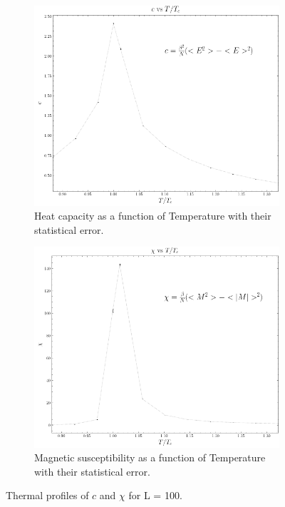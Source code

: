 \documentclass[article]{revtex4}
\begin{document}
\begin{figure}[h!]
\begin{subfigure}{.5\textwidth}
  \centering
  \includegraphics[width=0.7\linewidth]{heat_vs_T.png}
  \caption{Heat capacity as a function of Temperature with their statistical error.}
\end{subfigure}%
\begin{subfigure}{.5\textwidth}
  \centering
  \includegraphics[width=0.7\linewidth]{chi_vs_T.png}
  \caption{Magnetic susceptibility as a function of Temperature with their statistical error.}
\end{subfigure}
\caption{Thermal profiles of $c$ and $\chi$ for L = 100.}
\end{figure}
\end{document}
